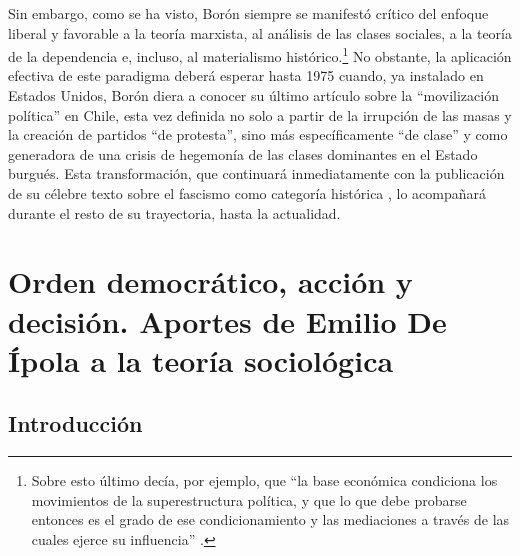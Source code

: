 {Sin embargo, como se ha visto, Borón siempre se manifestó crítico del enfoque liberal y favorable a la teoría marxista, al análisis de las clases sociales, a la teoría de la dependencia e, incluso, al materialismo histórico.\footnote{Sobre esto último decía, por ejemplo, que \enquote{la base económica condiciona los movimientos de la superestructura política, y que lo que debe probarse entonces es el grado de ese condicionamiento y las mediaciones a través de las cuales ejerce su influencia} \parencite[228]{1573-BORON1972}.} No obstante, la aplicación efectiva de este paradigma deberá esperar hasta 1975 cuando, ya instalado en Estados Unidos, Borón diera a conocer su último artículo sobre la \enquote{movilización política} en Chile, esta vez definida no solo a partir de la irrupción de las masas y la creación de partidos \enquote{de protesta}, sino más específicamente \enquote{de clase} y como generadora de una crisis de hegemonía de las clases dominantes en el Estado burgués. Esta transformación, que continuará inmediatamente con la publicación de su célebre texto sobre el fascismo como categoría histórica \parencite{1575-BORON1977}, lo acompañará durante el resto de su trayectoria, hasta la actualidad.

\chapter[Orden democrático, acción y decisión. Aportes de Emilio De Ípola a la teoría sociológica]{Orden democrático, acción y decisión. Aportes de Emilio De Ípola a la teoría sociológica}

\section{Introducción}

}

